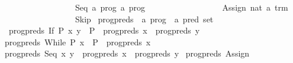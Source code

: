 \begin{isabellebody}
\ \ \ \ \ \ \ \ \ \ \ \ \ \ \ \ \ {}\ Seq\ {}{}a\ prog{}\ {}{}a\ prog{}\isanewline
\ \ \ \ \ \ \ \ \ \ \ \ \ \ \ \ \ {}\ Assign\ nat\ {}{}a\ trm{}\isanewline
\ \ \ \ \ \ \ \ \ \ \ \ \ \ \ \ \ {}\ Skip\isanewline
\isanewline
{}\isamarkupfalse%
\ prog{}preds\ {}{}\ {}{}a\ prog\ {}\ {}a\ pred\ set{}\ \isanewline
\ \ {}prog{}preds\ {}If\ P\ x\ y{}\ {}\ {}P{}\ {}\ prog{}preds\ x\ {}\ prog{}preds\ y{}\isanewline
{}\ {}prog{}preds\ {}While\ P\ x{}\ {}\ {}P{}\ {}\ prog{}preds\ x{}\isanewline
{}\ {}prog{}preds\ {}Seq\ x\ y{}\ {}\ prog{}preds\ x\ {}\ prog{}preds\ y{}\isanewline
{}\ {}prog{}preds\ {}Assign\ {}\ {}{}\ {}\ {}{}{}\isanewline

\end{isabellebody}

